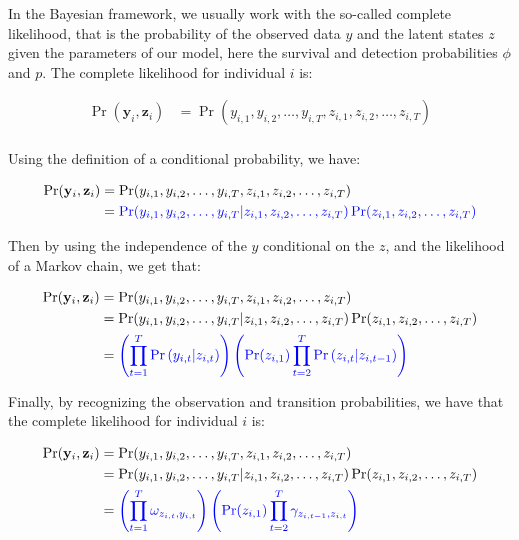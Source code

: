 \documentclass[
  12pt,
]{krantz}
\begin{document}
In the Bayesian framework, we usually work with the so-called complete likelihood, that is the probability of the observed data \(y\) and the latent states \(z\) given the parameters of our model, here the survival and detection probabilities \(\phi\) and \(p\). The complete likelihood for individual \(i\) is:

\begin{align*}
\Pr(\mathbf{y}_i, \mathbf{z}_i) &= \Pr(y_{i,1}, y_{i,2}, \ldots, y_{i,T}, z_{i,1}, z_{i,2}, \ldots, z_{i,T})\\
\end{align*}

Using the definition of a conditional probability, we have:

\begin{align*}
\Pr(\mathbf{y}_i, \mathbf{z}_i) &= \Pr(y_{i,1}, y_{i,2}, \ldots, y_{i,T}, z_{i,1}, z_{i,2}, \ldots, z_{i,T})\\
                  &= \color{blue}{\Pr(y_{i,1}, y_{i,2}, \ldots, y_{i,T} | z_{i,1}, z_{i,2}, \ldots, z_{i,T}) \Pr(z_{i,1}, z_{i,2}, \ldots, z_{i,T})}\\
\end{align*}

Then by using the independence of the \(y\) conditional on the \(z\), and the likelihood of a Markov chain, we get that:

\begin{align*}
\Pr(\mathbf{y}_i, \mathbf{z}_i) &= \Pr(y_{i,1}, y_{i,2}, \ldots, y_{i,T}, z_{i,1}, z_{i,2}, \ldots, z_{i,T})\\
                  &= \Pr(y_{i,1}, y_{i,2}, \ldots, y_{i,T} | z_{i,1}, z_{i,2}, \ldots, z_{i,T}) \Pr(z_{i,1}, z_{i,2}, \ldots, z_{i,T})\\
                &= \color{blue}{\left(\prod_{t=1}^T{\Pr{(y_{i,t} | z_{i,t})}}\right) \left(\Pr(z_{i,1}) \prod_{t=2}^T{\Pr{(z_{i,t} | z_{i,t-1})}}\right)}\\
\end{align*}

Finally, by recognizing the observation and transition probabilities, we have that the complete likelihood for individual \(i\) is:

\begin{align*}
\Pr(\mathbf{y}_i, \mathbf{z}_i) &= \Pr(y_{i,1}, y_{i,2}, \ldots, y_{i,T}, z_{i,1}, z_{i,2}, \ldots, z_{i,T})\\
                  &= \Pr(y_{i,1}, y_{i,2}, \ldots, y_{i,T} | z_{i,1}, z_{i,2}, \ldots, z_{i,T}) \Pr(z_{i,1}, z_{i,2}, \ldots, z_{i,T})\\
                &= \color{blue}{\left(\prod_{t=1}^T{\omega_{z_{i,t}, y_{i,t}}}\right) \left(\Pr(z_{i,1}) \prod_{t=2}^T{\gamma_{z_{i,t-1},z_{i,t}}}\right)}\\
\end{align*}
\end{document}
